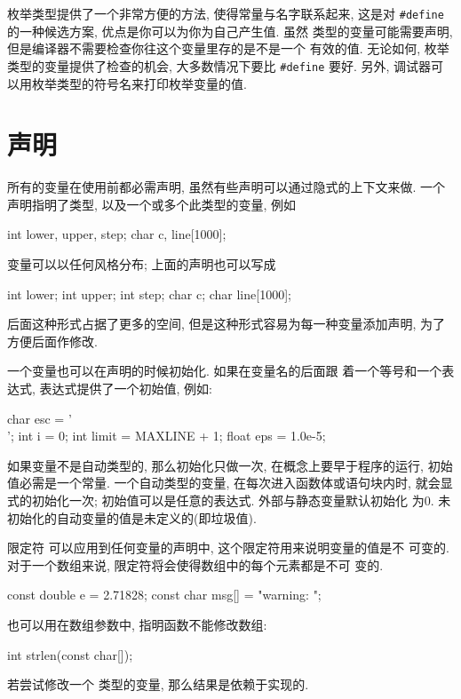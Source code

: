 枚举类型提供了一个非常方便的方法, 使得常量与名字联系起来, 这是对 
\verb"#define" 的一种候选方案, 优点是你可以为你为自己产生值. 虽然 \cenum 
类型的变量可能需要声明, 但是编译器不需要检查你往这个变量里存的是不是一个
有效的值. 无论如何, 枚举类型的变量提供了检查的机会, 大多数情况下要比
\verb"#define" 要好. 另外, 调试器可以用枚举类型的符号名来打印枚举变量的值.

\section{声明}
所有的变量在使用前都必需声明, 虽然有些声明可以通过隐式的上下文来做. 一个 
声明指明了类型, 以及一个或多个此类型的变量, 例如 
\begin{myverbatim}
    int lower, upper, step;
    char c, line[1000];
\end{myverbatim}
变量可以以任何风格分布; 上面的声明也可以写成
\begin{myverbatim}
    int lower;
    int upper;
    int step;
    char c;
    char line[1000];
\end{myverbatim}
后面这种形式占据了更多的空间, 但是这种形式容易为每一种变量添加声明, 为了 
方便后面作修改.

一个变量也可以在声明的时候初始化. 如果在变量名的后面跟 着一个等号和一个表
达式, 表达式提供了一个初始值, 例如:
\begin{myverbatim}
    char esc = '\\';
    int  i = 0;
    int  limit = MAXLINE + 1;
    float eps = 1.0e-5;
\end{myverbatim}
如果变量不是自动类型的, 那么初始化只做一次, 在概念上要早于程序的运行,
初始值必需是一个常量. 一个自动类型的变量, 在每次进入函数体或语句块内时, 
就会显式的初始化一次; 初始值可以是任意的表达式. 外部与静态变量默认初始化
为0. 未初始化的自动变量的值是未定义的(即垃圾值).

限定符 \cconst 可以应用到任何变量的声明中, 这个限定符用来说明变量的值是不
可变的. 对于一个数组来说, \cconst 限定符将会使得数组中的每个元素都是不可
变的.
\begin{myverbatim}
    const double e = 2.71828;
    const char msg[] = "warning: ";
\end{myverbatim}
\cconst 也可以用在数组参数中, 指明函数不能修改数组:
\begin{myverbatim}
    int strlen(const char[]);
\end{myverbatim}
若尝试修改一个 \cconst 类型的变量, 那么结果是依赖于实现的.

